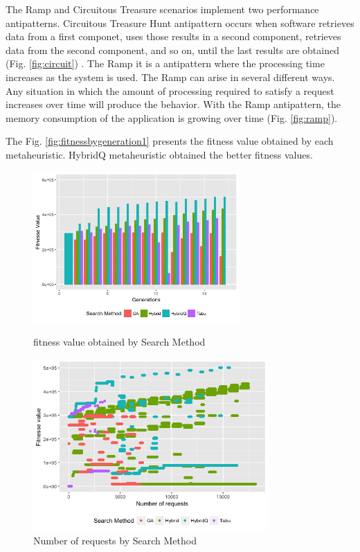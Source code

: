 The Ramp and Circuitous Treasure scenarios implement two performance antipatterns.  Circuitous Treasure Hunt antipattern occurs when software retrieves data from a first componet, uses those results in a second component, retrieves data from the second component, and so on, until the last results are obtained (Fig. \ref{fig:circuit})  \cite{Smith2002} \cite{Smith2003}. The Ramp it is a antipattern where the processing time increases as the system is used. The Ramp can arise in several different ways. Any situation in which the amount of processing required to satisfy a request increases over time will produce the behavior. With the Ramp antipattern, the memory consumption of the application is growing over time (Fig. \ref{fig:ramp}). 




The Fig. \ref{fig:fitnessbygeneration1}  presents the fitness value obtained by each metaheuristic. HybridQ metaheuristic obtained the better fitness values.  



\begin{figure}[h]
\begin{minipage}{.5\textwidth}
\centering
\includegraphics[width=0.7\textwidth]{./images/experiment1-1.png}
\caption{fitness value obtained by Search Method }
\label{fig:fitnessbygeneration1}
\end{minipage}
\begin{minipage}{.5\textwidth}
\centering
\includegraphics[width=0.8\textwidth]{./images/experiment1-3.png}
\caption{Number of requests by Search Method}
\label{fig:numberofrequestsbysearchmethod}
\end{minipage}
\end{figure}




